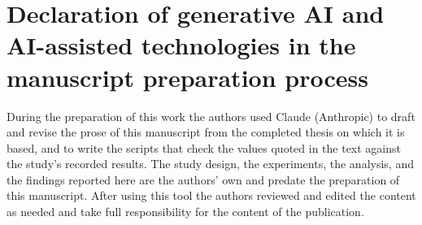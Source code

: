 \documentclass[preprint,review,12pt]{elsarticle}
\begin{document}
\section*{Declaration of generative AI and AI-assisted technologies in
  the manuscript preparation process}
During the preparation of this work the authors used Claude (Anthropic)
to draft and revise the prose of this manuscript from the completed
thesis on which it is based, and to write the scripts that check the
values quoted in the text against the study's recorded results. The
study design, the experiments, the analysis, and the findings reported
here are the authors' own and predate the preparation of this
manuscript. After using this tool the authors reviewed and edited the
content as needed and take full responsibility for the content of the
publication.



\end{document}

